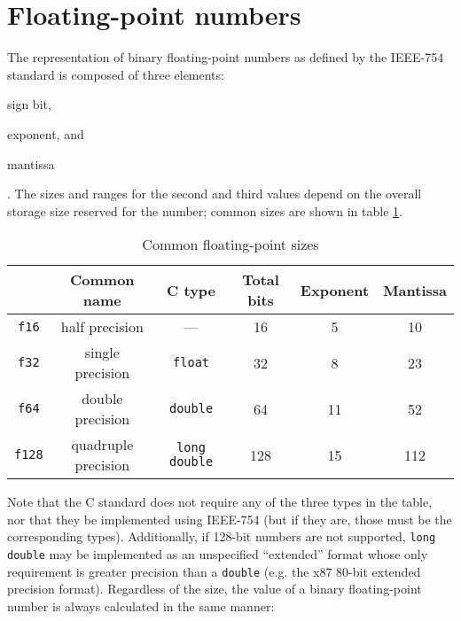 \section{Floating-point numbers}


The representation of binary floating-point numbers as defined by the IEEE-754
standard is composed of three elements: \begin{enumerate*}[1)] \item sign bit,
\item exponent, and \item mantissa \end{enumerate*}.  The sizes and ranges for
the second and third values depend on the overall storage size reserved for the
number; common sizes are shown in table \ref{tbl:arch:float}.

\begin{table}[ht]
    \centering
    \begin{tabular}{cccccc}
        & Common name & C type & Total bits & Exponent & Mantissa \\
        \hline
        \texttt{f16} & half precision & --- & 16 & 5 & 10 \\
        \texttt{f32} & single precision & \texttt{float} & 32 & 8 & 23 \\
        \texttt{f64} & double precision & \texttt{double} & 64 & 11 & 52 \\
        \texttt{f128} & quadruple precision & \texttt{long double} & 128 & 15
            & 112 \\
    \end{tabular}
    \caption{Common floating-point sizes}
    \label{tbl:arch:float}
\end{table}

Note that the C standard does not require any of the three types in the table,
nor that they be implemented using IEEE-754 (but if they are, those must be the
corresponding types).  Additionally, if 128-bit numbers are not supported,
\texttt{long double} may be implemented as an unspecified ``extended'' format
whose only requirement is greater precision than a \texttt{double} (e.g. the x87
80-bit extended precision format).  Regardless of the size, the value of a
binary floating-point number is always calculated in the same manner:

